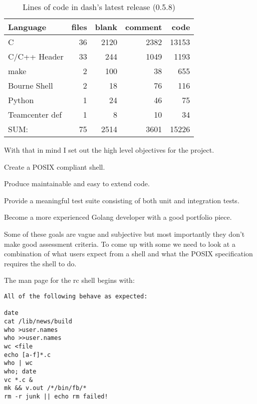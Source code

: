 \begin{table}[hp]
\centering
\caption{Lines of code in dash's latest release (0.5.8)}
\label{tab:dash-loc}
\begin{tabular}{@{}lrrrr@{}}
\toprule
Language       & files & blank & comment & code  \\ \midrule
C              & 36    & 2120  & 2382    & 13153 \\
C/C++ Header   & 33    & 244   & 1049    & 1193  \\
make           & 2     & 100   & 38      & 655   \\
Bourne Shell   & 2     & 18    & 76      & 116   \\
Python         & 1     & 24    & 46      & 75    \\
Teamcenter def & 1     & 8     & 10      & 34    \\ \midrule
SUM:           & 75    & 2514  & 3601    & 15226 \\ \bottomrule
\end{tabular}
\end{table}

With that in mind I set out the high level objectives for the project.

\begin{itemize*}
    \item Create a POSIX\cite{POSIX-SHELL-STANDARD} compliant shell.
    \item Produce maintainable and easy to extend code.
    \item Provide a meaningful test suite consisting of both unit and integration tests.
    \item Become a more experienced Golang developer with a good portfolio piece.
\end{itemize*}

Some of these goals are vague and subjective but most importantly they don't make good assessment criteria.
To come up with some we need to look at a combination of what users expect from a shell and what the POSIX specification requires the shell to do.

The man page for the rc shell begins with:
\begin{lstlisting}
All of the following behave as expected:

date
cat /lib/news/build
who >user.names
who >>user.names
wc <file
echo [a-f]*.c
who | wc
who; date
vc *.c &
mk && v.out /*/bin/fb/*
rm -r junk || echo rm failed!
\end{lstlisting}


